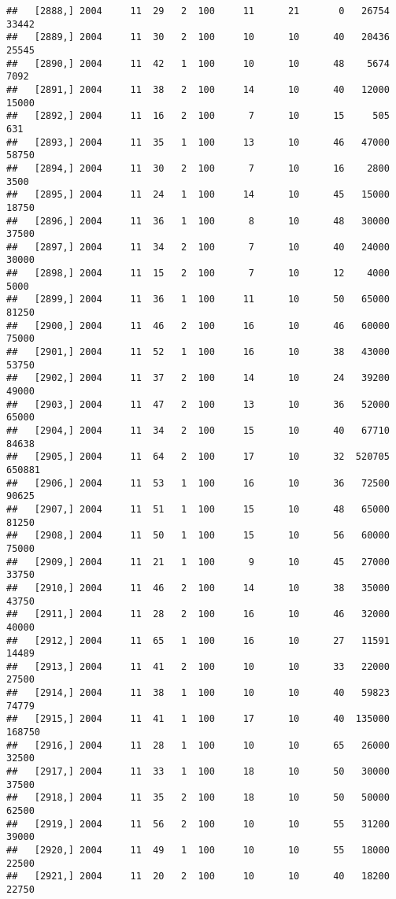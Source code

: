 \documentclass{article}\usepackage[]{graphicx}\usepackage[]{color}
\makeatletter
\newenvironment{kframe}{%
 \def\at@end@of@kframe{}%
 \ifinner\ifhmode%
  \def\at@end@of@kframe{\end{minipage}}%
  \begin{minipage}{\columnwidth}%
 \fi\fi%
 \def\FrameCommand##1{\hskip\@totalleftmargin \hskip-\fboxsep
 \colorbox{shadecolor}{##1}\hskip-\fboxsep
     \hskip-\linewidth \hskip-\@totalleftmargin \hskip\columnwidth}%
 \MakeFramed {\advance\hsize-\width
   \@totalleftmargin\z@ \linewidth\hsize
   \@setminipage}}%
 {\par\unskip\endMakeFramed%
 \at@end@of@kframe}
\newenvironment{knitrout}{}{} %
\makeatother
\begin{document}
\begin{knitrout}
\begin{kframe}
\begin{verbatim}
##   [2888,] 2004     11  29   2  100     11      21       0   26754   33442
##   [2889,] 2004     11  30   2  100     10      10      40   20436   25545
##   [2890,] 2004     11  42   1  100     10      10      48    5674    7092
##   [2891,] 2004     11  38   2  100     14      10      40   12000   15000
##   [2892,] 2004     11  16   2  100      7      10      15     505     631
##   [2893,] 2004     11  35   1  100     13      10      46   47000   58750
##   [2894,] 2004     11  30   2  100      7      10      16    2800    3500
##   [2895,] 2004     11  24   1  100     14      10      45   15000   18750
##   [2896,] 2004     11  36   1  100      8      10      48   30000   37500
##   [2897,] 2004     11  34   2  100      7      10      40   24000   30000
##   [2898,] 2004     11  15   2  100      7      10      12    4000    5000
##   [2899,] 2004     11  36   1  100     11      10      50   65000   81250
##   [2900,] 2004     11  46   2  100     16      10      46   60000   75000
##   [2901,] 2004     11  52   1  100     16      10      38   43000   53750
##   [2902,] 2004     11  37   2  100     14      10      24   39200   49000
##   [2903,] 2004     11  47   2  100     13      10      36   52000   65000
##   [2904,] 2004     11  34   2  100     15      10      40   67710   84638
##   [2905,] 2004     11  64   2  100     17      10      32  520705  650881
##   [2906,] 2004     11  53   1  100     16      10      36   72500   90625
##   [2907,] 2004     11  51   1  100     15      10      48   65000   81250
##   [2908,] 2004     11  50   1  100     15      10      56   60000   75000
##   [2909,] 2004     11  21   1  100      9      10      45   27000   33750
##   [2910,] 2004     11  46   2  100     14      10      38   35000   43750
##   [2911,] 2004     11  28   2  100     16      10      46   32000   40000
##   [2912,] 2004     11  65   1  100     16      10      27   11591   14489
##   [2913,] 2004     11  41   2  100     10      10      33   22000   27500
##   [2914,] 2004     11  38   1  100     10      10      40   59823   74779
##   [2915,] 2004     11  41   1  100     17      10      40  135000  168750
##   [2916,] 2004     11  28   1  100     10      10      65   26000   32500
##   [2917,] 2004     11  33   1  100     18      10      50   30000   37500
##   [2918,] 2004     11  35   2  100     18      10      50   50000   62500
##   [2919,] 2004     11  56   2  100     10      10      55   31200   39000
##   [2920,] 2004     11  49   1  100     10      10      55   18000   22500
##   [2921,] 2004     11  20   2  100     10      10      40   18200   22750

\end{verbatim}
\end{kframe}
\end{knitrout}
\end{document}
